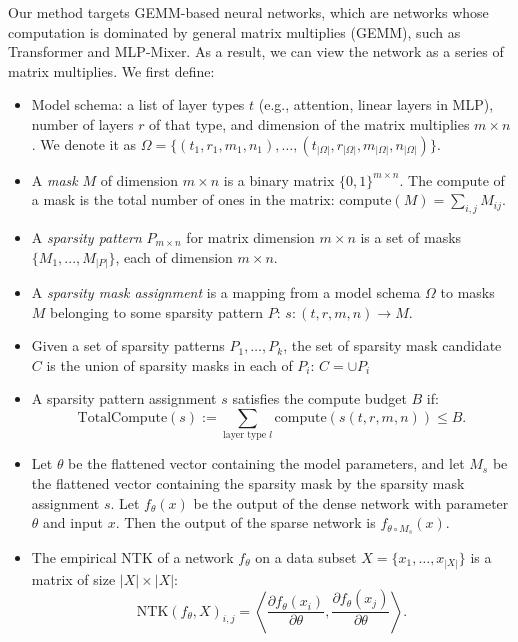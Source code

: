 Our method targets GEMM-based neural networks, which are networks whose computation is dominated by general matrix multiplies (GEMM), such as Transformer and MLP-Mixer.
As a result, we can view the network as a series of matrix multiplies.
We first define:
\begin{itemize}[leftmargin=*,nosep,nolistsep]
  \item Model schema: a list of layer types $t$ (e.g., attention, linear layers in MLP), number of layers $r$ of that type, and dimension of the matrix multiplies $m \times n$.
  We denote it as $\Omega = \{(t_1, r_1, m_1, n_1), \dots, (t_{|\Omega|}, r_{|\Omega|}, m_{|\Omega|}, n_{|\Omega|})\}$.
  \item A \emph{mask} $M$ of dimension $m \times n$ is a binary matrix $\{0, 1\}^{m \times n}$.
  The compute of a mask is the total number of ones in the matrix: $\mathrm{compute}(M) = \sum_{i, j} M_{ij}$.
  \item A \emph{sparsity pattern} $P_{m \times n}$ for matrix dimension $m \times n$ is a set of masks $\{M_1, ..., M_{|P|}\}$, each of dimension $m \times n$.
  \item A \emph{sparsity mask assignment} is a mapping from a model schema $\Omega$ to masks $M$ belonging to some sparsity pattern $P$: $s \colon (t, r, m, n) \to M$.
  \item Given a set of sparsity patterns $P_1, \dots, P_k$, the set of sparsity mask candidate $C$ is the union of sparsity masks in each of $P_i$: $C = \cup P_i$
  \item A sparsity pattern assignment $s$ satisfies the compute budget $B$ if:
\begin{equation}
\label{eq:budget}
  \mathrm{TotalCompute}(s) := \sum_{\text{layer type } l} \mathrm{compute}(s(t, r, m, n)) \le B.
\end{equation}
  \item Let $\theta$ be the flattened vector containing the model parameters, and let $M_s$ be the flattened vector containing the sparsity mask by the sparsity mask assignment $s$.
  Let $f_\theta(x)$ be the output of the dense network with parameter $\theta$ and input $x$.
  Then the output of the sparse network is $f_{\theta \circ M_s}(x)$.
  \item The empirical NTK of a network $f_\theta$ on a data subset $X = \{x_1, \dots, x_{|X|}\}$ is a matrix of size $|X| \times |X|$:
\begin{equation}
  \label{eq:empirical_ntk}
  \mathrm{NTK}(f_\theta, X)_{i, j} = \left \langle \frac{\partial f_\theta(x_i)}{\partial \theta}, \frac{\partial f_\theta(x_j)}{\partial \theta} \right \rangle.
\end{equation}
\end{itemize}

